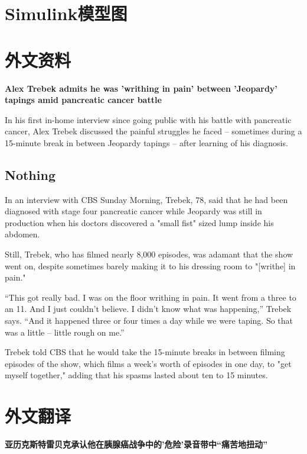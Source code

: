 \appendix
\section{Simulink模型图}


\newpage
\section{外文资料}
\vspace{30pt}
\begin{center}
	{\bfseries Alex Trebek admits he was 'writhing in pain' between 'Jeopardy' tapings amid pancreatic cancer battle}
\end{center}
\vspace{30pt}


In his first in-home interview since going public with his battle with pancreatic cancer, Alex Trebek discussed the painful struggles he faced – sometimes during a 15-minute break in between Jeopardy tapings – after learning of his diagnosis.

\subsection{{Nothing}}
In an interview with CBS Sunday Morning, Trebek, 78, said that he had been diagnosed with stage four pancreatic cancer while Jeopardy was still in production when his doctors discovered a "small fist" sized lump inside his abdomen.

Still, Trebek, who has filmed nearly 8,000 episodes, was adamant that the show went on, despite sometimes barely making it to his dressing room to "[writhe] in pain."

“This got really bad. I was on the floor writhing in pain. It went from a three to an 11. And I just couldn’t believe. I didn’t know what was happening,” Trebek says. “And it happened three or four times a day while we were taping. So that was a little – little rough on me.”

Trebek told CBS that he would take the 15-minute breaks in between filming episodes of the show, which films a week's worth of episodes in one day, to "get myself together," adding that his spasms lasted about ten to 15 minutes.

\newpage
\section{外文翻译}
\vspace{30pt}
\begin{center}
	{\bfseries 亚历克斯特雷贝克承认他在胰腺癌战争中的'危险'录音带中“痛苦地扭动”}
\end{center}
\vspace{30pt}

